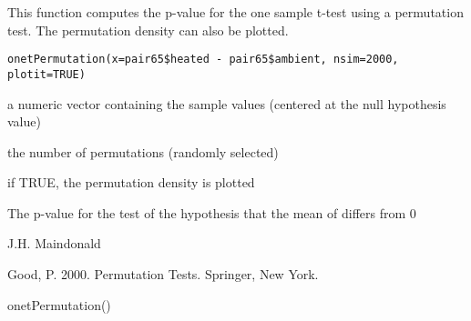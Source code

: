 \begin{Description}\relax
This function computes the p-value for the one sample
t-test using a permutation test.  The permutation
density can  also be plotted.
\end{Description}
\begin{Usage}
\begin{verbatim}
onetPermutation(x=pair65$heated - pair65$ambient, nsim=2000, plotit=TRUE)
\end{verbatim}
\end{Usage}
\begin{Arguments}
\begin{ldescription}
\item[\code{x}] a numeric vector containing the sample values (centered
at the null hypothesis value) 
\item[\code{nsim}] the number of permutations (randomly selected)
\item[\code{plotit}] if TRUE, the permutation density is plotted 
\end{ldescription}
\end{Arguments}
\begin{Value}
The p-value for the test of the hypothesis that the mean of 
differs from 0
\end{Value}
\begin{Author}\relax
J.H. Maindonald
\end{Author}
\begin{References}\relax
Good, P. 2000. Permutation Tests. Springer, New York.
\end{References}
\begin{Examples}
\begin{ExampleCode}
onetPermutation()
\end{ExampleCode}
\end{Examples}

